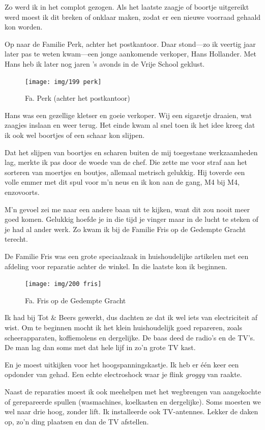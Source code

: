 \documentclass[10pt,twoside, openright]{memoir}
\begin{document}
Zo werd ik in het complot gezogen. Als het laatste zaagje of boortje uitgereikt werd moest ik dit breken of onklaar maken, zodat er een nieuwe voorraad gehaald kon worden. 

Op naar de Familie Perk, achter het postkantoor. Daar stond---zo ik veertig jaar later pas te weten kwam---een jonge aankomende verkoper, Hans Hollander. Met Hans heb ik later nog jaren ’s avonds in de Vrije School geklust. 

\begin{figure}
\texttt{[image: img/199 perk]}
\caption*{\footnotesize Fa. Perk (achter het postkantoor)}
\end{figure}

Hans was een gezellige kletser en goeie verkoper. Wij een sigaretje draaien, wat zaagjes inslaan en weer terug. Het einde kwam al snel toen ik het idee kreeg dat ik ook wel boortjes of een schaar kon slijpen. 

Dat het slijpen van boortjes en scharen buiten de mij toegestane werkzaamheden lag, merkte ik pas door de woede van de chef. Die zette me voor straf aan het sorteren van moertjes en boutjes, allemaal metrisch gelukkig. Hij toverde een volle emmer met dit spul voor m’n neus en ik kon aan de gang, M4 bij M4, enzovoorts. 

M’n gevoel zei me naar een andere baan uit te kijken, want dit zou nooit meer goed komen. Gelukkig hoefde je in die tijd je vinger maar in de lucht te steken of je had al ander werk. Zo kwam ik bij de Familie Fris op de Gedempte Gracht terecht.

De Familie Fris was een grote speciaalzaak in huishoudelijke artikelen met een afdeling voor reparatie achter de winkel. In die laatste kon ik beginnen. 

\begin{figure}
\texttt{[image: img/200 fris]}
\caption*{\footnotesize Fa. Fris op de Gedempte Gracht}
\end{figure}

Ik had bij Tot \& Beers gewerkt, dus dachten ze dat ik wel iets van electriciteit af wist. Om te beginnen mocht ik het klein huishoudelijk goed repareren, zoals scheerapparaten, koffiemolens en dergelijke. De baas deed de radio’s en de TV’s. De man lag dan soms met dat hele lijf in zo’n grote TV kast. 

En je moest uitkijken voor het hoogspanningskastje. Ik heb er één keer een opdonder van gehad. Een echte electroshock waar je flink \emph{groggy} van raakte.

Naast de reparaties moest ik ook meehelpen met het wegbrengen van aangekochte of gerepareerde spullen (wasmachines, koelkasten en dergelijke). Soms moesten we wel naar drie hoog, zonder lift. Ik installeerde ook TV-antennes. Lekker de daken op, zo’n ding plaatsen en dan de TV afstellen. 
\end{document}
